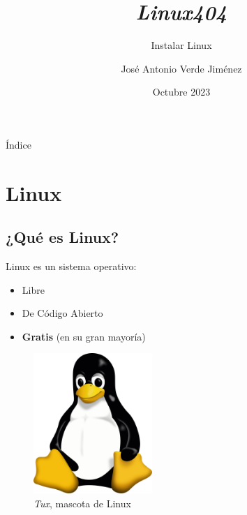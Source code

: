 \documentclass[aspectratio=43]{beamer}
\title{\textit{Linux404}}
\subtitle{Instalar Linux}
\author{José Antonio Verde Jiménez}
\date{Octubre 2023}
\institute{\edicion \ Talleres del GUL}
\date{\fecha}
\begin{document}
    {
        \frame{\titlepage}
    }
    \addtocounter{framenumber}{-1}
    \begin{frame}{Índice}
        \begin{multicols}{2}
            \tableofcontents

        \end{multicols}
    \end{frame}

    \section{Linux}

    \subsection{¿Qué es Linux?}
    \begin{frame}
        \begin{multicols}{2}
            Linux es un sistema operativo:
            \begin{itemize}
                \item Libre
                \item De Código Abierto
                \item \textbf{Gratis} (en su gran mayoría)
            \end{itemize}

            \newpage

            \begin{figure}[b]
                \includegraphics[width=0.4\textwidth]{img/tux.png}
                \caption*{\textit{Tux}, mascota de Linux}
            \end{figure}
        \end{multicols}
    \end{frame}
\end{document}

